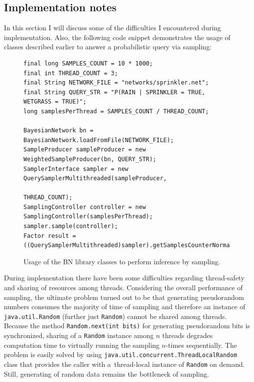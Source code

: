 \documentclass[english,cover]{fitthesis} %
\newcommand{\srccode}[1]{{\tt #1}}         %
\begin{document}
\subsection{Implementation notes}
In this section I will discuss some of the difficulties I encountered during implementation. Also, the following code snippet demonstrates the usage of classes described earlier to answer a probabilistic query via sampling:

\begin{figure}[ht]
\begin{center}
\begin{verbatim}
final long SAMPLES_COUNT = 10 * 1000;
final int THREAD_COUNT = 3;
final String NETWORK_FILE = "networks/sprinkler.net";
final String QUERY_STR = "P(RAIN | SPRINKLER = TRUE, WETGRASS = TRUE)";
long samplesPerThread = SAMPLES_COUNT / THREAD_COUNT;

BayesianNetwork bn = BayesianNetwork.loadFromFile(NETWORK_FILE);
SampleProducer sampleProducer = new WeightedSampleProducer(bn, QUERY_STR);
SamplerInterface sampler = new QuerySamplerMultithreaded(sampleProducer,
                                                         THREAD_COUNT);
SamplingController controller = new SamplingController(samplesPerThread);
sampler.sample(controller);
Factor result = ((QuerySamplerMultithreaded)sampler).getSamplesCounterNormalized();
\end{verbatim}
\end{center}
\caption{Usage of the BN library classes to perform inference by sampling.}
\end{figure}

During implementation there have been some difficulties regarding thread-safety and sharing of resources among threads. Considering the overall performance of sampling, the ultimate problem turned out to be that generating pseudorandom numbers consumes the majority of time of sampling and therefore an instance of \srccode{java.util.Random} (further just \srccode{Random}) cannot be shared among threads. Because the method \srccode{Random.next(int bits)} for generating pseudorandom bits is synchronized, sharing of a \srccode{Random} instance among $n$ threads degrades computation time to virtually running the sampling $n$-times sequentially. The problem is easily solved by using \srccode{java.util.concurrent.ThreadLocalRandom} class that provides the caller with a~thread-local instance of \srccode{Random} on demand. Still, generating of random data remains the bottleneck of sampling.
\end{document}

